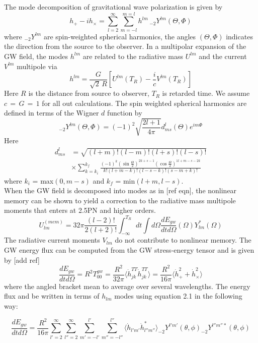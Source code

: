 \documentclass[prd,preprintnumbers,twocolumn,eqsecnum,floatfix,letter]{revtex4}
\begin{document}
The mode decomposition of gravitational wave polarization is given by
\begin{equation}
	h_+ - \mathit{i}h_{\times} = \sum_{l=2}^{\infty}\sum_{m=-l}^{m=l}h^{lm} \,  _{-2}Y^{lm}(\Theta, \Phi)
\end{equation}
where $_{-2}Y^{lm}$ are spin-weighted spherical harmonics, the angles $(\Theta, \Phi)$ indicates the direction from the source to the observer. In a multipolar expansion of the GW field, the modes $h^{lm}$ are related to the radiative mass $U^{lm}$ and the current $V^{lm}$ multipole via
\begin{equation}
	h^{lm}= \frac{G}{\sqrt{2}\, R }\left[U^{lm}(T_R)-\frac{\mathit{i}}{c}V^{lm}(T_R)\right]
\end{equation}
Here $R$ is the distance from source to observer, $T_R$ is retarded time. We assume $c\,=\,G\,=\,1$ for all out calculations.
 The spin weighted spherical harmonics are defined in terms of the Wigner $d$ function by
\begin{equation}
	_{-2}Y^{lm}(\Theta, \Phi) = (-1)^2\sqrt{\frac{2l + 1}{4\pi}}d^{l}_{ms}(\Theta)e^{\mathit{i}m\Phi}
\end{equation} 
Here
\begin{align}
	d^{l}_{ms}&=\sqrt{(l+m)!(l-m)!(l+s)!(l-s)!}\\
	&\times \sum_{k=k_i}^{k_f}\frac{(-1)^k(\sin\frac{\Theta}{2})^{2k+s-1}(\cos\frac{\Theta}{2})^{1l+m-s-2k}}{k!(l+m-k)!(l-s-k)!(s-m+k)!}
\end{align}
where $k_i$ = max$(0, m-s)$ and $k_f$ = min$(l+m, l-s)$. \\
When the GW field is decomposed into modes as in [ref eqn], the nonlinear memory can be shown to yield a correction to the radiative mass multipole moments that enters at 2.5PN and higher orders.
\begin{equation}
	U^{(mem)}_{lm}=32\pi\frac{(l-2)!}{2(l+2)!}\int_{-\infty}^{T_R}dt\int d\Omega\frac{dE_{gw}}{dtd\Omega}(\Omega)Y^*_{lm}(\Omega)
\end{equation}
The radiative current moments $V_{lm}$ do not contribute to nonlinear memory. The GW energy flux can be computed from the GW stress-energy tensor and is given by [add ref]
\begin{equation}
	\frac{dE_{gw}}{dtd\Omega} = R^2 T^{gw}_{00} = \frac{R^2}{32\pi}\langle\dot{h}^{TT}_{jk}\dot{h}^{TT}_{jk}\rangle =\frac{R^2}{16\pi}\langle\dot{h}^2_{+}+ \dot{h}^2_{\times}\rangle
\end{equation}
where the angled bracket mean to average over several wavelengths. The energy flux and be written in terms of $h_{lm}$ modes using equation 2.1 in the following way:
\begin{widetext}
\begin{equation}
		\frac{dE_{gw}}{dtd\Omega}=\frac{R^2}{16\pi}\sum_{l'=2}^{\infty}\sum_{l''=2}^{\infty}\sum_{m'=-l'}^{l'}\sum_{m''=-l''}^{l''}\langle\dot{h}_{l'm'}\dot{h}^*_{l''m''}\rangle _{-2}Y^{l'm'}(\theta,\phi)_{-2}Y^{l''m''*}(\theta, \phi)
\end{equation}
\end{widetext}
\end{document}
